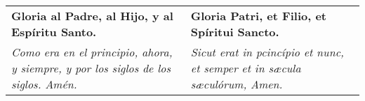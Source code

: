 \documentclass[./devocionario.tex]{subfiles}
\begin{document}
    \begin{longtable} { p{} p{} }
        \textbf{Gloria al Padre, al Hijo, y al Espíritu Santo.} &
        \textbf{Gloria Patri, et Filio, et Spíritui Sancto.}\\
        
        \textit{Como era en el principio, ahora, y siempre, y por los siglos de los siglos. Amén.} &
        \textit{Sicut erat in pcincípio et nunc, et semper et in sæcula sæculórum, Amen.}
    \end{longtable}
\end{document}
